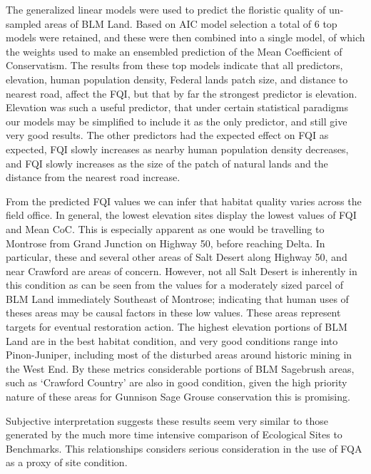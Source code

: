 \documentclass[
]{article}
\begin{document}
The generalized linear models were used to predict the floristic quality
of un-sampled areas of BLM Land. Based on AIC model selection a total of
6 top models were retained, and these were then combined into a single
model, of which the weights used to make an ensembled prediction of the
Mean Coefficient of Conservatism. The results from these top models
indicate that all predictors, elevation, human population density,
Federal lands patch size, and distance to nearest road, affect the FQI,
but that by far the strongest predictor is elevation. Elevation was such
a useful predictor, that under certain statistical paradigms our models
may be simplified to include it as the only predictor, and still give
very good results. The other predictors had the expected effect on FQI
as expected, FQI slowly increases as nearby human population density
decreases, and FQI slowly increases as the size of the patch of natural
lands and the distance from the nearest road increase.

From the predicted FQI values we can infer that habitat quality varies
across the field office. In general, the lowest elevation sites display
the lowest values of FQI and Mean CoC. This is especially apparent as
one would be travelling to Montrose from Grand Junction on Highway 50,
before reaching Delta. In particular, these and several other areas of
Salt Desert along Highway 50, and near Crawford are areas of concern.
However, not all Salt Desert is inherently in this condition as can be
seen from the values for a moderately sized parcel of BLM Land
immediately Southeast of Montrose; indicating that human uses of theses
areas may be causal factors in these low values. These areas represent
targets for eventual restoration action. The highest elevation portions
of BLM Land are in the best habitat condition, and very good conditions
range into Pinon-Juniper, including most of the disturbed areas around
historic mining in the West End. By these metrics considerable portions
of BLM Sagebrush areas, such as `Crawford Country' are also in good
condition, given the high priority nature of these areas for Gunnison
Sage Grouse conservation this is promising.

Subjective interpretation suggests these results seem very similar to
those generated by the much more time intensive comparison of Ecological
Sites to Benchmarks. This relationships considers serious consideration
in the use of FQA as a proxy of site condition.
\end{document}
